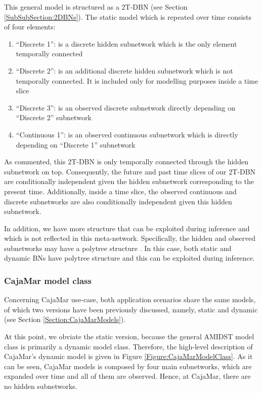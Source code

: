This general model is structured as a 2T-DBN (see Section \ref{SubSubSection:2DBNs}). The static model which is repeated over time consists of four elements: 

\begin{enumerate}
\item ``Discrete 1'': is a discrete hidden subnetwork which is the only element temporally connected
\item ``Discrete 2'': is an additional discrete hidden subnetwork which is not temporally connected. It is included only for modelling purposes inside a time slice
\item ``Discrete 3'': is an observed discrete subnetwork directly depending on ``Discrete 2'' subnetwork
\item  ``Continuous 1'': is an observed continuous subnetwork which is directly depending on ``Discrete 1'' subnetwork
\end{enumerate}

As commented, this 2T-DBN is only temporally connected through the hidden subnetwork on top. Consequently, the future and past time slices of our 2T-DBN are conditionally independent given the hidden subnetwork corresponding to the present time. Additionally, inside a time slice, the observed continuous and discrete subnetworks are also conditionally independent given this hidden subnetwork.

In addition, we have more structure that can be exploited during inference and which is not reflected in this meta-network. Specifically, the hidden and observed subnetworks may have a polytree structure \cite{JensenNielsen2007}. In this case, both static and dynamic BNs have polytree structure and this can be exploited during inference. 

\subsubsection{CajaMar model class}

Concerning CajaMar use-case, both application scenarios share the same models, of which two versions have been previously discussed, namely, static and dynamic (see Section \ref{Section:CajaMarModels}). 

At this point, we obviate the static version, because the general AMIDST model class is primarily a dynamic model class. Therefore, the high-level description of CajaMar's dynamic model is given in Figure \ref{Figure:CajaMarModelClass}. As it can be seen, CajaMar models is composed by four main subnetworks, which are expanded over time and all of them are observed. Hence, at CajaMar, there are no hidden subnetworks. 

